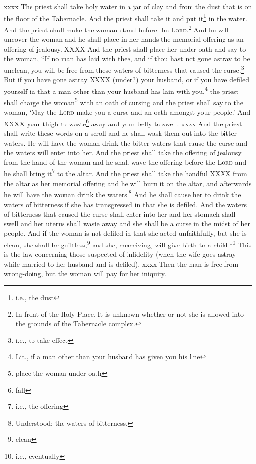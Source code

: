 \begin{enumerate}[align=center]
     xxxx%
     The priest shall take holy water in a jar of clay and from the dust that is on the floor of the Tabernacle. And the priest shall take it and put it\footnote{i.e., the dust} in the water.%
     And the priest shall make the woman stand before the \textsc{Lord}.\footnote{In front of the Holy Place. It is unknown whether or not she is allowed into the grounds of the Tabernacle complex.} And he will uncover the woman and he shall place in her hands the memorial offering as an offering of jealousy. XXXX%
     And the priest shall place her under oath and say to the woman, ``If no man has laid with thee, and if thou hast not gone astray to be unclean, you will be free from these waters of bitterness that caused the curse.\footnote{i.e., to take effect}%
     But if you have gone astray XXXX (under?) your husband, or if you have defiled yourself in that a man other than your husband has lain with you,\footnote{Lit., if a man other than your husband has given you his line}%
     the priest shall charge the woman\footnote{place the woman under oath} with an oath of cursing and the priest shall say to the woman, `May the \textsc{Lord} make you a curse and an oath amongst your people.' And XXXX your thigh to waste\footnote{fall} away and your belly to swell.%
     xxxx%
     And the priest shall write these words on a scroll and he shall wash them out into the bitter waters.%
     He will have the woman drink the bitter waters that cause the curse and the waters will enter into her.%
     And the priest shall take the offering of jealousy from the hand of the woman and he shall wave the offering before the \textsc{Lord} and he shall bring it\footnote{i.e., the offering} to the altar.%
     And the priest shall take the handful XXXX from the altar as her memorial offering and he will burn it on the altar, and afterwards he will have the woman drink the waters.\footnote{Understood: the waters of bitterness.}%
     And he shall cause her to drink the waters of bitterness if she has transgressed in that she is defiled. And the waters of bitterness that caused the curse shall enter into her and her stomach shall swell and her uterus shall waste away and she shall be a curse in the midst of her people.%
     And if the woman is not defiled in that she acted unfaithfully, but she is clean, she shall be guiltless,\footnote{clean} and she, conceiving, will give birth to a child.\footnote{i.e., eventually}%
     This is the law concerning those suspected of infidelity (when the wife goes astray while married to her husband and is defiled).%
     xxxx%
     Then the man is free from wrong-doing, but the woman will pay for her iniquity.%
\end{enumerate}
